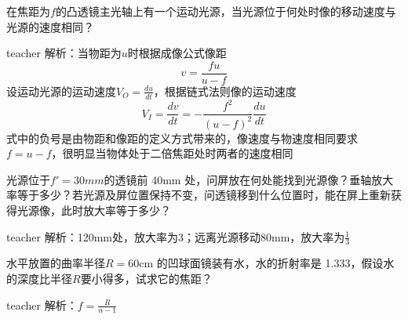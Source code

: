 \begin{example}
	在焦距为$f$的凸透镜主光轴上有一个运动光源，当光源位于何处时像的移动速度与光源的速度相同？
	\begin{taggedblock}{teacher}
		\newline
		解析：当物距为$u$时根据成像公式像距
		\[
		v=\frac{fu}{u-f}
		\]
		设运动光源的运动速度$V_O = \frac{du}{dt}$，根据链式法则像的运动速度
		\[
		V_I = \frac{dv}{dt}=-\frac{f^2}{(u-f)^2}\frac{du}{dt}
		\]
		式中的负号是由物距和像距的定义方式带来的，像速度与物速度相同要求$f=u-f$，很明显当物体处于二倍焦距处时两者的速度相同
	\end{taggedblock}
\end{example}


\begin{example}
	光源位于$f'=30\si{mm}$的透镜前 40mm 处，问屏放在何处能找到光源像？垂轴放大率等于多少？若光源及屏位置保持不变，问透镜移到什么位置时，能在屏上重新获得光源像，此时放大率等于多少？
	\begin{taggedblock}{teacher}
		\newline
		解析：120mm处，放大率为3；远离光源移动80mm，放大率为$\frac{1}{3}$
	\end{taggedblock}
\end{example}

\begin{example}
水平放置的曲率半径$ R=60$cm 的凹球面镜装有水，水的折射率是 1.333，假设水的深度比半径$ R $要小得多，试求它的焦距？
	\begin{taggedblock}{teacher}
		\newline
		解析：$f=\frac{R}{n-1}$
	\end{taggedblock}
\end{example}

